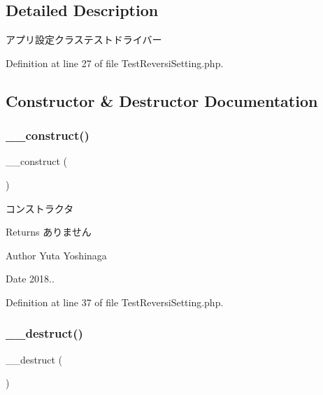 \subsection{Detailed Description}
アプリ設定クラステストドライバー 

Definition at line 27 of file Test\+Reversi\+Setting.\+php.



\subsection{Constructor \& Destructor Documentation}
\mbox{\label{class_test_reversi_setting_a095c5d389db211932136b53f25f39685}} 
\subsubsection{\texorpdfstring{\+\_\+\+\_\+construct()}{\_\_construct()}}
{\footnotesize\ttfamily \+\_\+\+\_\+construct (\begin{DoxyParamCaption}{ }\end{DoxyParamCaption})}



コンストラクタ 

\begin{DoxyReturn}{Returns}
ありません 
\end{DoxyReturn}
\begin{DoxyAuthor}{Author}
Yuta Yoshinaga 
\end{DoxyAuthor}
\begin{DoxyDate}{Date}
2018.. 
\end{DoxyDate}


Definition at line 37 of file Test\+Reversi\+Setting.\+php.

\mbox{\label{class_test_reversi_setting_a421831a265621325e1fdd19aace0c758}} 
\subsubsection{\texorpdfstring{\+\_\+\+\_\+destruct()}{\_\_destruct()}}
{\footnotesize\ttfamily \+\_\+\+\_\+destruct (\begin{DoxyParamCaption}{ }\end{DoxyParamCaption})}



